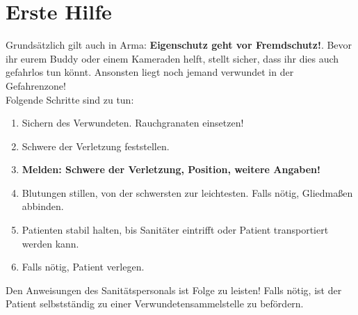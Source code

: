 \newpage
\section{Erste Hilfe}
Grundsätzlich gilt auch in Arma: \textbf{Eigenschutz geht vor Fremdschutz!}. Bevor ihr eurem Buddy oder einem Kameraden helft, stellt sicher, dass ihr dies auch gefahrlos tun könnt. Ansonsten liegt noch jemand verwundet in der Gefahrenzone!\\
Folgende Schritte sind zu tun:
\begin{enumerate}
	\item Sichern des Verwundeten. Rauchgranaten einsetzen!
	\item Schwere der Verletzung feststellen.
	\item \textbf{Melden: Schwere der Verletzung, Position, weitere Angaben!}
	\item Blutungen stillen, von der schwersten zur leichtesten. Falls nötig, Gliedmaßen abbinden.
	\item Patienten stabil halten, bis Sanitäter eintrifft oder Patient transportiert werden kann.
	\item Falls nötig, Patient verlegen.
\end{enumerate}
Den Anweisungen des Sanitätspersonals ist Folge zu leisten! Falls nötig, ist der Patient selbstständig zu einer Verwundetensammelstelle zu befördern.